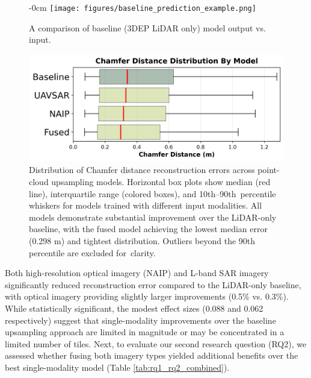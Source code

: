 \documentclass[remotesensing,article,accept,pdftex,moreauthors]{Definitions/mdpi}
\renewcommand{\hl}[1]{#1}
\begin{document}
\begin{figure}[H]

\begin{adjustwidth}{-\extralength}{0cm}
\centering %
\texttt{[image: figures/baseline\_prediction\_example.png]}
\end{adjustwidth}
    \caption{\hl{A} %
 comparison of baseline (3DEP LiDAR only) model output vs. input.}
    \label{fig:baseline_pt_cloud_example}
\end{figure}


\vspace{-10pt}

\begin{figure}[H]
    \includegraphics[width=0.75\linewidth]{figures/boxplot_by_model.png}
    \caption{Distribution of Chamfer distance reconstruction errors across point-cloud upsampling models. Horizontal box plots show median (red line), interquartile range (colored boxes), and \mbox{10th--90th percentile} whiskers for models trained with different input modalities. All models demonstrate substantial improvement over the LiDAR-only baseline, with the fused model achieving the lowest median error (0.298 m) and tightest distribution. Outliers beyond the 90th percentile are excluded \mbox{for clarity}.}
    \label{fig:boxplot_model_comparison}
\end{figure}



Both high-resolution optical imagery (NAIP) and L-band SAR imagery significantly reduced reconstruction error compared to the LiDAR-only baseline, with optical imagery providing slightly larger improvements (0.5\% vs. 0.3\%). While statistically significant, the modest effect sizes (0.088 and 0.062 respectively) suggest that single-modality improvements over the baseline upsampling approach are limited in magnitude or may be concentrated in a limited number of tiles. Next, to evaluate our second research question (RQ2), we assessed whether fusing both imagery types yielded additional benefits over the best single-modality model (Table \ref{tab:rq1_rq2_combined}).
\end{document}
